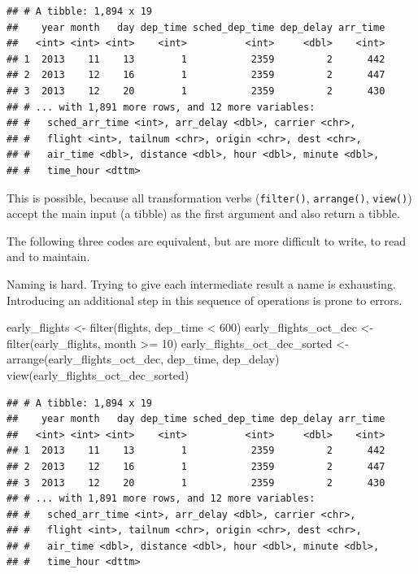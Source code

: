 \documentclass[]{book}
\newenvironment{Shaded}{}{}
\newcommand{\DecValTok}[1]{#1}
\newcommand{\KeywordTok}[1]{\textcolor[rgb]{0.00,0.00,1.00}{#1}}
\newcommand{\NormalTok}[1]{#1}
\newcommand{\OperatorTok}[1]{#1}
\newcommand{\StringTok}[1]{\textcolor[rgb]{0.00,0.50,0.50}{#1}}
\begin{document}
\begin{verbatim}
## # A tibble: 1,894 x 19
##    year month   day dep_time sched_dep_time dep_delay arr_time
##   <int> <int> <int>    <int>          <int>     <dbl>    <int>
## 1  2013    11    13        1           2359         2      442
## 2  2013    12    16        1           2359         2      447
## 3  2013    12    20        1           2359         2      430
## # ... with 1,891 more rows, and 12 more variables:
## #   sched_arr_time <int>, arr_delay <dbl>, carrier <chr>,
## #   flight <int>, tailnum <chr>, origin <chr>, dest <chr>,
## #   air_time <dbl>, distance <dbl>, hour <dbl>, minute <dbl>,
## #   time_hour <dttm>
\end{verbatim}

This is possible, because all transformation verbs (\texttt{filter()}, \texttt{arrange()}, \texttt{view()}) accept the main input (a tibble) as the first argument and also return a tibble.

The following three codes are equivalent, but are more difficult to write, to read and to maintain.

Naming is hard.
Trying to give each intermediate result a name is exhausting.
Introducing an additional step in this sequence of operations is prone to errors.

\begin{Shaded}
\begin{Highlighting}[]
\NormalTok{early_flights <-}\StringTok{ }\KeywordTok{filter}\NormalTok{(flights, dep_time }\OperatorTok{<}\StringTok{ }\DecValTok{600}\NormalTok{)}
\NormalTok{early_flights_oct_dec <-}\StringTok{ }\KeywordTok{filter}\NormalTok{(early_flights, month }\OperatorTok{>=}\StringTok{ }\DecValTok{10}\NormalTok{)}
\NormalTok{early_flights_oct_dec_sorted <-}\StringTok{ }\KeywordTok{arrange}\NormalTok{(early_flights_oct_dec, dep_time, dep_delay)}
\KeywordTok{view}\NormalTok{(early_flights_oct_dec_sorted)}
\end{Highlighting}
\end{Shaded}

\begin{verbatim}
## # A tibble: 1,894 x 19
##    year month   day dep_time sched_dep_time dep_delay arr_time
##   <int> <int> <int>    <int>          <int>     <dbl>    <int>
## 1  2013    11    13        1           2359         2      442
## 2  2013    12    16        1           2359         2      447
## 3  2013    12    20        1           2359         2      430
## # ... with 1,891 more rows, and 12 more variables:
## #   sched_arr_time <int>, arr_delay <dbl>, carrier <chr>,
## #   flight <int>, tailnum <chr>, origin <chr>, dest <chr>,
## #   air_time <dbl>, distance <dbl>, hour <dbl>, minute <dbl>,
## #   time_hour <dttm>
\end{verbatim}
\end{document}
